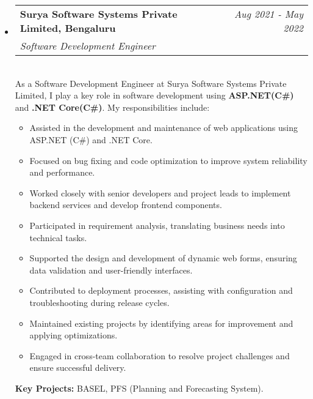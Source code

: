 \documentclass[a4paper,12pt]{article}
\makeatletter
\newcommand{\resumeSubHeadingListStart}{\begin{itemize}[leftmargin=*,labelsep=1mm,noitemsep]}
\newcommand{\resumeSubHeadingListEnd}{\end{itemize}\vspace{2mm}}
\newcommand{\resumeItemListStart}{\begin{itemize}[leftmargin=3ex, rightmargin=2ex, noitemsep,labelsep=1.2mm,itemsep=0mm]\small}
\newcommand{\resumeItemListEnd}{\end{itemize}\vspace{-2mm}}
\newcommand{\resumeExperience}[4]{
\vspace{0.5mm}\item
    \begin{tabular*}{0.98\textwidth}[t]{l@{\extracolsep{\fill}}r}
        \textbf{#1} & \textit{\footnotesize{#3}}\\
        \textit{\footnotesize{#2}} & {}
    \end{tabular*}\\ [1mm]
    \footnotesize{#4}
}
\newcommand{\emptyLine}{\\[-3mm]}
\makeatother
\begin{document}
\resumeSubHeadingListStart
\resumeExperience {Surya Software Systems Private Limited, Bengaluru}
 {Software Development Engineer} {Aug 2021 - May 2022}
{
As a Software Development Engineer at Surya Software Systems Private Limited, I play a key role in software development using \textbf{ASP.NET(C\#)} and \textbf{.NET Core(C\#)}. My responsibilities include:
}\emptyLine
\resumeItemListStart
  \item Assisted in the development and maintenance of web applications using ASP.NET (C\#) and .NET Core.
  \item Focused on bug fixing and code optimization to improve system reliability and performance.
  \item Worked closely with senior developers and project leads to implement backend services and develop frontend components.
  \item Participated in requirement analysis, translating business needs into technical tasks.
  \item Supported the design and development of dynamic web forms, ensuring data validation and user-friendly interfaces.
  \item Contributed to deployment processes, assisting with configuration and troubleshooting during release cycles.
  \item Maintained existing projects by identifying areas for improvement and applying optimizations.
  \item Engaged in cross-team collaboration to resolve project challenges and ensure successful delivery.
\resumeItemListEnd
 \textbf{Key Projects:} BASEL, PFS (Planning and Forecasting System).
\resumeSubHeadingListEnd


\vfill
\end{document}
